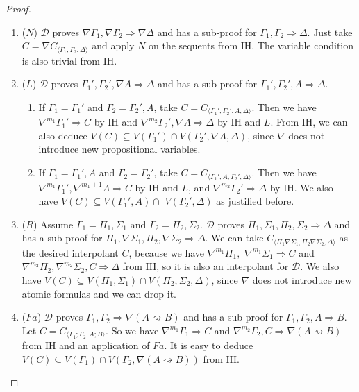 \documentclass[12pt,a4paper]{article}
\theoremstyle{plain}
\theoremstyle{definition}
\begin{document}
\begin{proof}
\begin{enumerate}
		\item ($N$) $\mathcal{D}$ proves $\nabla \Gamma_1 , \nabla \Gamma_2 \Rightarrow \nabla \Delta$ and has a sub-proof for $\Gamma_1 , \Gamma_2 \Rightarrow \Delta$. Just take $C = \nabla C_{\langle\Gamma_1;\Gamma_2;\Delta\rangle}$ and apply $N$ on the sequents from IH. The variable condition is also trivial from IH.
		
		\item ($L$) $\mathcal{D}$ proves $\Gamma_1' , \Gamma_2' , \nabla A \Rightarrow \Delta$ and has a sub-proof for $\Gamma_1' , \Gamma_2' , A \Rightarrow \Delta$.
		\begin{enumerate}
			\item If $\Gamma_1 = \Gamma_1'$ and $\Gamma_2 = \Gamma_2' , A$, take $C = C_{\langle\Gamma_1';\Gamma_2',A;\Delta\rangle}$. Then we have $\nabla^{m_1} \Gamma_1' \Rightarrow C$ by IH and $\nabla^{m_2}\Gamma_2' , \nabla A \Rightarrow \Delta$ by IH and $L$. From IH, we can also deduce $V(C) \subseteq V(\Gamma_1') \cap V(\Gamma_2',\nabla A,\Delta)$, since $\nabla$ does not introduce new propositional variables.
			
			\item If $\Gamma_1 = \Gamma_1' , A$ and $\Gamma_2 = \Gamma_2'$, take $C = C_{\langle\Gamma_1',A;\Gamma_2';\Delta\rangle}$. Then we have $\nabla^{m_1}\Gamma_1', \nabla^{m_1+1}A \Rightarrow C$ by IH and $L$, and $\nabla^{m_2}\Gamma_2' \Rightarrow \Delta$ by IH. We also have $V(C) \subseteq V(\Gamma_1',A) \cap$ $V(\Gamma_2',\Delta)$ as justified before.
		\end{enumerate}

		\item ($R$) Assume $\Gamma_1 = \Pi_1, \Sigma_1$ and $\Gamma_2 = \Pi_2, \Sigma_2$. $\mathcal{D}$ proves $\Pi_1, \Sigma_1, \Pi_2, \Sigma_2 \Rightarrow \Delta$ and has a sub-proof for $\Pi_1, \nabla\Sigma_1, \Pi_2, \nabla\Sigma_2 \Rightarrow \Delta$.
		We can take $C_{\langle\Pi_1\nabla\Sigma_1;\Pi_2\nabla\Sigma_2;\Delta\rangle}$ as the desired interpolant $C$, because we have $\nabla^{m_1}\Pi_1,$ $\nabla^{m_1}\Sigma_1 \Rightarrow C$ and $\nabla^{m_2}\Pi_2, \nabla^{m_2}\Sigma_2, C \Rightarrow \Delta$ from IH, so it is also an interpolant for $\mathcal{D}$. We also have $V(C) \subseteq V(\Pi_1,\Sigma_1) \cap V(\Pi_2,\Sigma_2,\Delta)$, since $\nabla$ does not introduce new atomic formulas and we can drop it.

		\item ($Fa$) $\mathcal{D}$ proves $\Gamma_1 , \Gamma_2 \Rightarrow \nabla(A \rightsquigarrow B)$ and has a sub-proof for $\Gamma_1 , \Gamma_2 , A \Rightarrow B$. Let $C = C_{\langle\Gamma_1;\Gamma_2,A;B\rangle}$. So we have $\nabla^{m_1}\Gamma_1 \Rightarrow C$ and $\nabla^{m_2}\Gamma_2 , C \Rightarrow \nabla (A \rightsquigarrow B)$ from IH and an application of $Fa$.
		It is easy to deduce $V(C) \subseteq V(\Gamma_1) \cap V(\Gamma_2 , \nabla (A \rightsquigarrow B))$ from IH.


\end{enumerate}
\end{proof}
\end{document}
